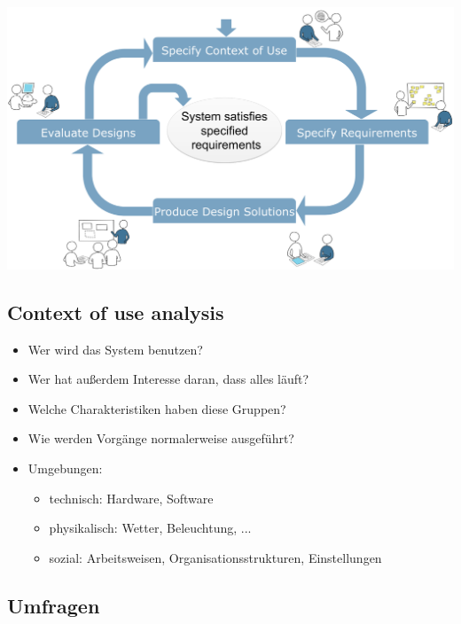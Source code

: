 \documentclass[a4paper,10pt]{article}
\begin{document}
\includegraphics[width=\textwidth]{inc/HCDP.pdf}

\subsection{Context of use analysis}
\begin{itemize}
	\item Wer wird das System benutzen?
	\item Wer hat außerdem Interesse daran, dass alles läuft?
	\item Welche Charakteristiken haben diese Gruppen?
	\item Wie werden Vorgänge normalerweise ausgeführt?
	\item Umgebungen:
	\begin{itemize}
		\item technisch: Hardware, Software
		\item physikalisch: Wetter, Beleuchtung, ...
		\item sozial: Arbeitsweisen, Organisationsstrukturen, Einstellungen
	\end{itemize}
\end{itemize}

\subsection{Umfragen}
\end{document}
